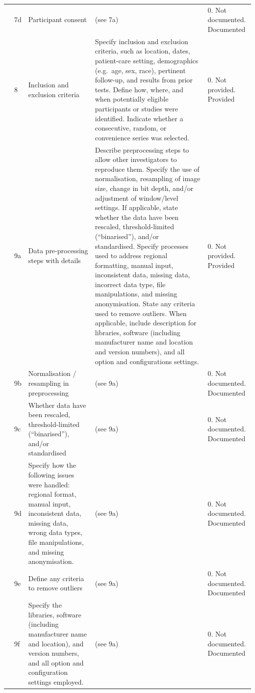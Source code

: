 \begin{landscape}
\begin{longtable}{@{}p{1.7cm}p{0.7cm}p{3.6cm}p{9.6cm}p{3.2cm}@{}}
	& 7d & Participant consent & (see 7a) & 0. Not documented\newline 1. Documented \\
	\addlinespace
	& 8 & Inclusion and exclusion criteria & Specify inclusion and exclusion criteria, such as location, dates, patient-care setting, demographics (e.g.\ age, sex, race), pertinent follow-up, and results from prior tests. Define how, where, and when potentially eligible participants or studies were identified. Indicate whether a consecutive, random, or convenience series was selected. & 0. Not provided\newline 1. Provided \\
	\addlinespace
	& 9a & Data pre-processing steps with details & Describe preprocessing steps to allow other investigators to reproduce them. Specify the use of normalisation, resampling of image size, change in bit depth, and/or adjustment of window/level settings. If applicable, state whether the data have been rescaled, threshold-limited (``binarised''), and/or standardised. Specify processes used to address regional formatting, manual input, inconsistent data, missing data, incorrect data type, file manipulations, and missing anonymisation. State any criteria used to remove outliers. When applicable, include description for libraries, software (including manufacturer name and location and version numbers), and all option and configurations settings. & 0. Not provided\newline 1. Provided \\
	& 9b & Normalisation / resampling in preprocessing & (see 9a) & 0. Not documented\newline 1. Documented \\
	& 9c & Whether data have been rescaled, threshold-limited (``binarised''), and/or standardised & (see 9a) & 0. Not documented\newline 1. Documented \\
	& 9d & Specify how the following issues were handled: regional format, manual input, inconsistent data, missing data, wrong data types, file manipulations, and missing anonymisation. & (see 9a) & 0. Not documented\newline 1. Documented \\
	& 9e & Define any criteria to remove outliers & (see 9a) & 0. Not documented\newline 1. Documented \\
	& 9f & Specify the libraries, software (including manufacturer name and location), and version numbers, and all option and configuration settings employed. & (see 9a) & 0. Not documented\newline 1. Documented \\

\end{longtable}
\end{landscape}
